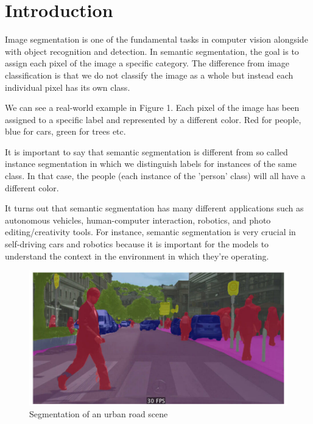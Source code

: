 \chapter{Introduction}
Image segmentation is one of the fundamental tasks in computer vision alongside with object recognition and detection. In semantic segmentation, the goal is to assign each pixel of the image a specific category. The difference from image classification is that we do not classify the image as a whole but instead each individual pixel has its own class. 

We can see a real-world example in Figure 1. Each pixel of the image has been assigned to a specific label and represented by a different color. Red for people, blue for cars, green for trees etc.

It is important to say that semantic segmentation is different from so called instance segmentation in which we distinguish labels for instances of the same class. In that case, the people (each instance of the 'person' class) will all have a different color. %

It turns out that semantic segmentation has many different applications such as autonomous vehicles, human-computer interaction, robotics, and photo editing/creativity tools. For instance, semantic segmentation is very crucial in self-driving cars and robotics because it is important for the models to understand the context in the environment in which they’re operating. %

\vspace{5mm}
\begin{figure}[htb]
	\begin{center}
		\includegraphics*[width=13cm, keepaspectratio]{obr/semseg.jpg}
	\end{center}
	\caption{Segmentation of an urban road scene} %
	\label{cocka}
\end{figure}

